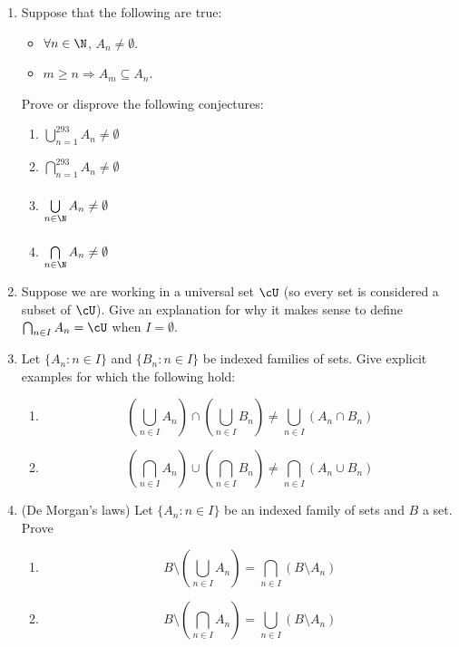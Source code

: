 \begin{enumerate}
  \item Suppose that the following are true:
  \begin{itemize}
    \item $\forall n\in\N$, $A_n\neq\emptyset$.
    \item $m\ge n\Longrightarrow A_m\subseteq A_n$.
  \end{itemize}
  Prove or disprove the following conjectures:\\
	\begin{minipage}{0.4\textwidth}
  \begin{enumerate}
    \item $\bigcup\limits_{n=1}^{293}A_n\neq\emptyset$
    \item $\bigcap\limits_{n=1}^{293}A_n\neq\emptyset$
	\end{enumerate}
	\end{minipage}
	\begin{minipage}{0.4\textwidth}
  \begin{enumerate}\setcounter{enumii}{2}
    \item $\bigcup\limits_{n\in\N}^{\phantom{293}}A_n\neq\emptyset$
		\item $\bigcap\limits_{n\in\N}^{\phantom{293}}A_n\neq\emptyset$
	\end{enumerate}
	\end{minipage}
	
	\item Suppose we are working in a universal set $\cU$ (so every set is considered a subset of $\cU$). Give an explanation for why it makes sense to define $\bigcap_{n \in I} A_n = \cU$ when $I = \emptyset$.

\item Let $\{A_n : n \in I\}$ and $\{B_n : n \in I\}$ be indexed families of sets. Give explicit examples for which the following hold:
\begin{enumerate}
    \item \[\left(\bigcup_{n \in I} A_n \right) \cap \left(\bigcup_{n \in I} B_n \right) \neq \bigcup_{n \in I} (A_n \cap B_n)\]
    \item \[\left(\bigcap_{n \in I} A_n \right) \cup \left(\bigcap_{n \in I} B_n \right) \neq \bigcap_{n \in I} (A_n \cup B_n)\]
\end{enumerate}

\item (De Morgan's laws) Let $\{A_n : n \in I\}$ be an indexed family of sets and $B$ a set. Prove
\begin{enumerate}
    \item \[B \setminus \left(\bigcup_{n \in I} A_n \right) = \bigcap_{n \in I} (B \setminus A_n)\]
    \item \[B \setminus \left(\bigcap_{n \in I} A_n \right) = \bigcup_{n \in I} (B \setminus A_n)\]
\end{enumerate}


\end{enumerate}
